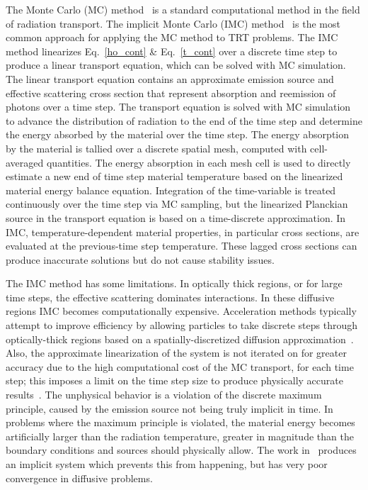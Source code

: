 \documentclass[11pt]{article}
\begin{document}
The Monte Carlo (MC) method~\cite{shultis_mc} is a standard computational method in
the field of radiation transport.
 The implicit Monte Carlo (IMC) method~\cite{fnc}
is the most common approach for applying the MC method to TRT problems. The IMC
method linearizes Eq.~\eqref{ho_cont} \& Eq.~\eqref{t_cont} over a discrete time
step to produce a linear transport equation, which can be solved with MC
simulation.  The linear transport equation contains an approximate emission source
and effective scattering cross section that represent
absorption and reemission of photons over a time step.  The transport equation is
solved with MC simulation 
to advance the distribution of radiation to the end of the time step and determine
the energy absorbed by the material over the time step.  The energy absorption by
the material is tallied over a discrete spatial mesh, computed with cell-averaged
quantities.
  The energy absorption in each mesh cell is used to directly estimate
a new end of time step material temperature based on the linearized material
energy balance equation. Integration of the
time-variable is treated continuously over the time step via MC sampling, but the
linearized Planckian source in the transport equation is based on a time-discrete
approximation.
In IMC, temperature-dependent
material properties, in particular cross sections, are evaluated at the previous-time
step temperature. These lagged cross sections can produce inaccurate solutions but
do not cause stability issues.  

The IMC method has some limitations.  In optically thick regions, or for
large time steps, the
effective scattering dominates interactions.  In these diffusive regions IMC
becomes computationally expensive. Acceleration methods typically attempt to improve
efficiency by allowing particles to take discrete steps through optically-thick
regions based on a spatially-discretized diffusion approximation~\cite{imd,ddmc}. 
Also, the 
approximate linearization of the system is not iterated on for greater accuracy due
to the high computational cost of the MC transport, for each time step; this
imposes a limit on the time step size to produce physically accurate
results~\cite{wollaber2013discrete}.  The unphysical behavior is a violation of the
discrete maximum principle, caused by the emission source not being
truly implicit in time. 
  In problems where the maximum principle
is violated, the material energy becomes artificially larger than the radiation
temperature, greater in magnitude than the boundary conditions and sources
should physically allow.  The work in~\cite{iimc_gentile} produces an implicit system
which prevents this from happening, but has very poor convergence in diffusive
problems.
\end{document}
